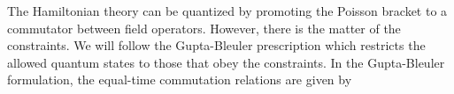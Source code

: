 The Hamiltonian theory can be quantized by promoting the Poisson bracket to a commutator
between field operators.  However, there is the matter of the constraints.  We will follow the Gupta-Bleuler
prescription which restricts the allowed quantum states to those that obey the constraints.  
In the Gupta-Bleuler formulation, the equal-time commutation relations are given by 
